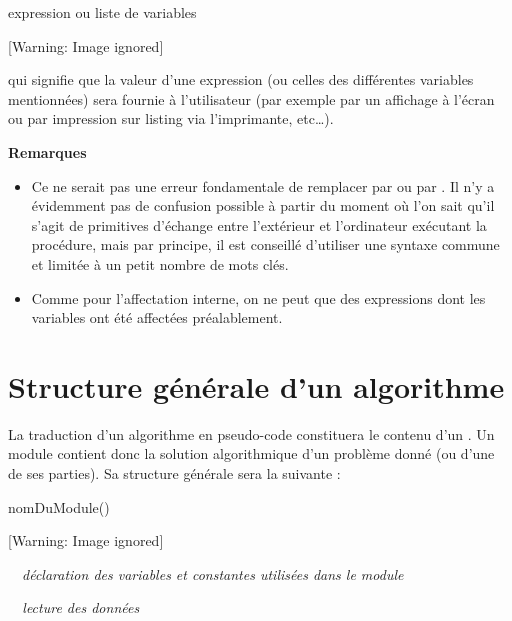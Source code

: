 {\sffamily
{} expression ou liste de variables}

\begin{center}
 [Warning: Image ignored] %

\end{center}
{
qui signifie que la valeur d’une expression (ou celles des différentes
variables mentionnées) sera fournie à l’utilisateur (par exemple par un
affichage à l’écran ou par impression sur listing via l’imprimante,
etc…).}


\bigskip

{\bfseries
Remarques}

\liststyleListv
\begin{itemize}
\item {
Ce ne serait pas une erreur fondamentale de remplacer
 par  ou
 par . Il n’y a
évidemment pas de confusion possible à partir du moment où l’on sait
qu’il s’agit de primitives d’échange entre l’extérieur et l’ordinateur
exécutant la procédure, mais par principe, il est conseillé d’utiliser
une syntaxe commune et limitée à un petit nombre de mots clés. }
\item {
Comme pour l’affectation interne, on ne peut 
que des expressions dont les variables ont été affectées préalablement.
}
\end{itemize}
\section{Structure générale d’un algorithme}
{
La traduction d’un algorithme en pseudo-code constituera le contenu d’un
. Un module contient donc la solution
algorithmique d’un problème donné (ou d’une de ses parties). Sa
structure générale sera la suivante :}

{\sffamily
{} nomDuModule()}

\begin{center}
 [Warning: Image ignored] %

\end{center}
{\sffamily
\ \ \textit{déclaration des variables et constantes utilisées dans le
module}}

{\sffamily\itshape
\ \ lecture des données}

